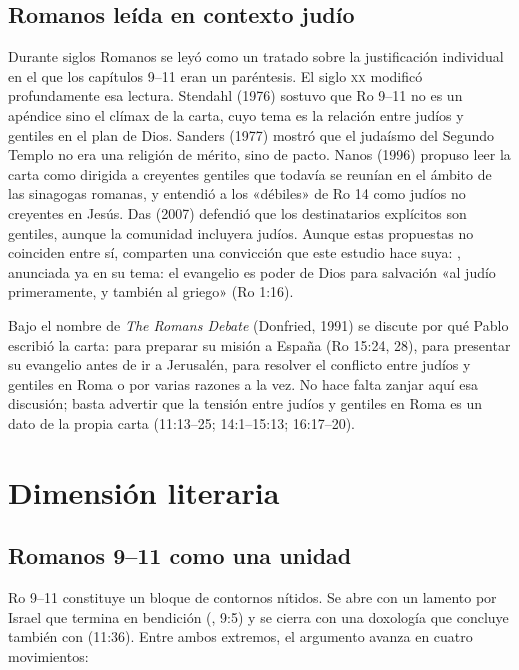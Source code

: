 \subsection{Romanos leída en contexto judío}
Durante siglos Romanos se leyó como un tratado sobre la justificación individual en el que los capítulos 9--11 eran un paréntesis. El siglo \textsc{xx} modificó profundamente esa lectura. Stendahl (1976) sostuvo que Ro 9--11 no es un apéndice sino el clímax de la carta, cuyo tema es la relación entre judíos y gentiles en el plan de Dios. Sanders (1977) mostró que el judaísmo del Segundo Templo no era una religión de mérito, sino de pacto. Nanos (1996) propuso leer la carta como dirigida a creyentes gentiles que todavía se reunían en el ámbito de las sinagogas romanas, y entendió a los «débiles» de Ro 14 como judíos no creyentes en Jesús. Das (2007) defendió que los destinatarios explícitos son gentiles, aunque la comunidad incluyera judíos. Aunque estas propuestas no coinciden entre sí, comparten una convicción que este estudio hace suya: , anunciada ya en su tema: el evangelio es poder de Dios para salvación «al judío primeramente, y también al griego» (Ro 1:16).

\begin{nota}
Bajo el nombre de \emph{The Romans Debate} (Donfried, 1991) se discute por qué Pablo escribió la carta: para preparar su misión a España (Ro 15:24, 28), para presentar su evangelio antes de ir a Jerusalén, para resolver el conflicto entre judíos y gentiles en Roma o por varias razones a la vez. No hace falta zanjar aquí esa discusión; basta advertir que la tensión entre judíos y gentiles en Roma es un dato de la propia carta (11:13--25; 14:1--15:13; 16:17--20).
\end{nota}

\section{Dimensión literaria}

\subsection{Romanos 9--11 como una unidad}
Ro 9--11 constituye un bloque de contornos nítidos. Se abre con un lamento por Israel que termina en bendición (, 9:5) y se cierra con una doxología que concluye también con  (11:36). Entre ambos extremos, el argumento avanza en cuatro movimientos:

